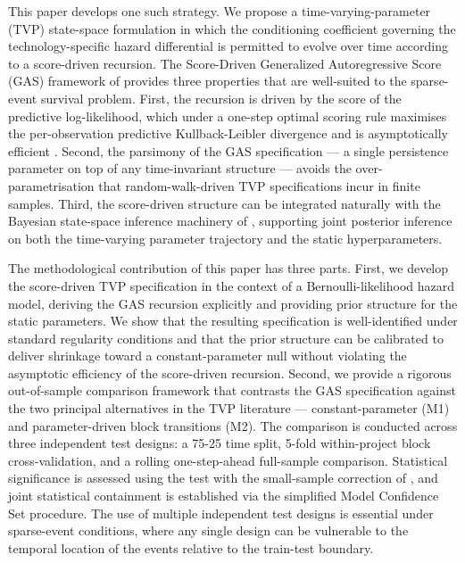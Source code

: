 \documentclass[12pt,a4paper]{article}
\theoremstyle{plain}
\theoremstyle{definition}
\begin{document}
This paper develops one such strategy. We propose a time-varying-parameter (TVP) state-space formulation in which the conditioning coefficient governing the technology-specific hazard differential is permitted to evolve over time according to a score-driven recursion. The Score-Driven Generalized Autoregressive Score (GAS) framework of \cite{creal2013generalized} provides three properties that are well-suited to the sparse-event survival problem. First, the recursion is driven by the score of the predictive log-likelihood, which under a one-step optimal scoring rule maximises the per-observation predictive Kullback-Leibler divergence and is asymptotically efficient \citep{harvey2013dynamic, blasques2015robust}. Second, the parsimony of the GAS specification --- a single persistence parameter on top of any time-invariant structure --- avoids the over-parametrisation that random-walk-driven TVP specifications incur in finite samples. Third, the score-driven structure can be integrated naturally with the Bayesian state-space inference machinery of \cite{durbin2012time}, supporting joint posterior inference on both the time-varying parameter trajectory and the static hyperparameters.

The methodological contribution of this paper has three parts. First, we develop the score-driven TVP specification in the context of a Bernoulli-likelihood hazard model, deriving the GAS recursion explicitly and providing prior structure for the static parameters. We show that the resulting specification is well-identified under standard regularity conditions and that the prior structure can be calibrated to deliver shrinkage toward a constant-parameter null without violating the asymptotic efficiency of the score-driven recursion. Second, we provide a rigorous out-of-sample comparison framework that contrasts the GAS specification against the two principal alternatives in the TVP literature --- constant-parameter (M1) and parameter-driven block transitions (M2). The comparison is conducted across three independent test designs: a 75-25 time split, 5-fold within-project block cross-validation, and a rolling one-step-ahead full-sample comparison. Statistical significance is assessed using the \cite{diebold1995comparing} test with the small-sample correction of \cite{harvey1997testing}, and joint statistical containment is established via the simplified \cite{hansen2011model} Model Confidence Set procedure. The use of multiple independent test designs is essential under sparse-event conditions, where any single design can be vulnerable to the temporal location of the events relative to the train-test boundary.
\end{document}
